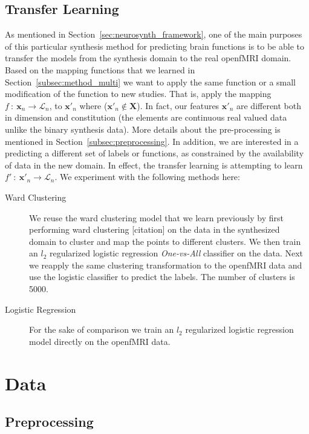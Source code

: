 \documentclass{article} %
\begin{document}
 \subsection{Transfer Learning}
 As mentioned in Section~\ref{sec:neurosynth_framework}, one of the main purposes of this particular synthesis method for predicting brain functions is to be able to transfer the models from the synthesis domain to the real openfMRI domain. Based on the mapping functions that we learned in Section~\ref{subsec:method_multi} we want to apply the same function or a small modification of the function to new studies. That is, apply the mapping $f\ :\ \mathbf{x}_n \rightarrow \mathcal{L}_n$, to $\mathbf{x}'_n$ where ($\mathbf{x}'_n \notin \mathbf{X}$). In fact, our features $\mathbf{x}'_n$ are different both in dimension and constitution (the elements are continuous real valued data unlike the binary synthesis data). More details about the pre-processing is mentioned in Section~\ref{subsec:preprocessing}. In addition, we are interested in a predicting a different set of labels or functions, as constrained by the availability of data in the new domain. In effect, the transfer learning is attempting to learn $f'\ :\ \mathbf{x}'_n \rightarrow \mathcal{L}_n$. We experiment with the following methods here:
  \begin{description}
  \item[Ward Clustering] We reuse the ward clustering model that we learn previously by first performing ward clustering [citation] on the data in the synthesized domain to cluster and map the points to different clusters. We then train an $l_2$ regularized logistic regression \textit{One-vs-All} classifier on the data. Next we reapply the same clustering transformation to the openfMRI data and use the logistic classifier to predict the labels. The number of clusters is 5000.
  \item[Logistic Regression] For the sake of comparison we train an $l_2$ regularized logistic regression model directly on the openfMRI data.
  \end{description}

\section{Data}

\subsection{Preprocessing}
\end{document}
